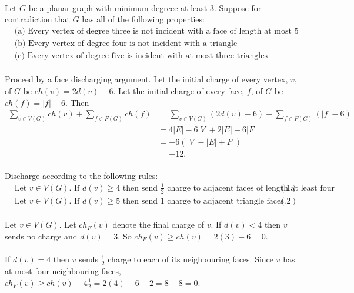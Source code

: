 \documentclass[letterpaper,12pt,oneside,onecolumn]{report}
\begin{document}
\paragraph{}
Let $G$ be a planar graph with minimum degreee at least $3$. Suppose for contradiction that $G$ has all of the following properties:
\begin{align*}
&\text{(a) Every vertex of degree three is not incident with a face of length at most } 5\\
&\text{(b) Every vertex of degree four is not incident with a triangle} \\
&\text{(c) Every vertex of degree five is incident with at most three triangles}
\end{align*}
\paragraph{}
Proceed by a face discharging argument. Let the initial charge of every vertex, $v$, of $G$ be $ch(v) = 2d(v) - 6$. Let the initial charge of every face, $f$, of $G$ be $ch(f) = |f| - 6$. Then
\begin{align*}
\sum_{v \in V(G)} ch(v) + \sum_{f \in F(G)} ch(f) &= \sum_{v \in V(G)} (2d(v) - 6) + \sum_{f \in F(G)} (|f| - 6) \\ &= 4|E| - 6|V| + 2|E| - 6|F| \\ &= -6(|V| - |E| + F|) \\ &= -12. 
\end{align*}
\paragraph{}
Discharge according to the following rules:
\begin{align*}
&\text{Let } v\in V(G) \text{. If } d(v) \geq 4 \text{ then send } \frac{1}{2} \text{ charge to adjacent faces of length at least four} &(1)\\
&\text{Let } v \in V(G) \text{. If } d(v) \geq 5 \text{ then send } 1 \text{ charge to adjacent triangle faces.} &(2)
\end{align*}
\paragraph{}
Let $v \in V(G)$. Let $ch_F(v)$ denote the final charge of $v$. If $d(v) < 4$ then $v$ sends no charge and $d(v) = 3$. So $ch_F(v) \geq ch(v)  = 2(3) - 6 = 0$. 
\paragraph{}
If $d(v) = 4$ then $v$ sends $\frac{1}{2}$ charge to each of its neighbouring faces. Since $v$ has at most four neighbouring faces, $ch_F(v) \geq ch(v) - 4\frac{1}{2} = 2(4) - 6 - 2 = 8 - 8 = 0$. 
\end{document}
